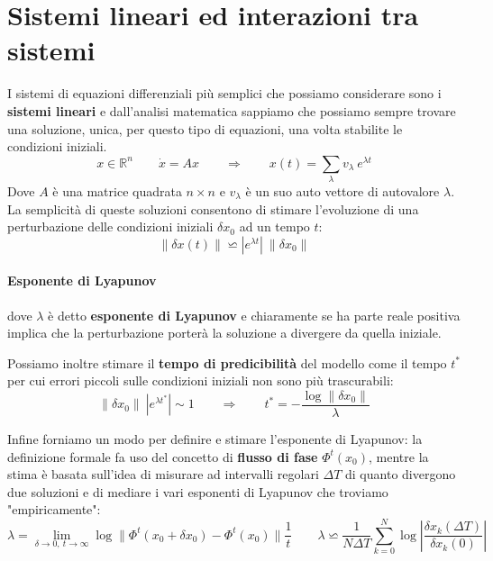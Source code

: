 \section{Sistemi lineari ed interazioni tra sistemi}

I sistemi di equazioni differenziali più semplici che possiamo considerare sono i \textbf{sistemi lineari} e dall'analisi matematica sappiamo che possiamo sempre trovare una soluzione, unica, per questo tipo di equazioni, una volta stabilite le condizioni iniziali.
\begin{equation}
	x\in\mathbb{R}^n \qquad \dot{x}=Ax \qquad \Rightarrow \qquad x(t)=\sum_\lambda v_\lambda \ e^{\lambda t}
\end{equation}
Dove $A$ è una matrice quadrata $n\times n$ e $v_\lambda$ è un suo auto vettore di autovalore $\lambda$.\\

La semplicità di queste soluzioni consentono di stimare l'evoluzione di una perturbazione delle condizioni iniziali $\delta x_0$ ad un tempo $t$:
\begin{equation}
	\|\delta x(t)\| \backsimeq |e^{\lambda t}|\ \|\delta x_0\|
\end{equation}
\paragraph{Esponente di Lyapunov}
dove $\lambda$ è detto \textbf{esponente di Lyapunov} e chiaramente se ha parte reale positiva implica che la perturbazione porterà la soluzione a divergere da quella iniziale.

Possiamo inoltre stimare il \textbf{tempo di predicibilità} del modello come il tempo $t^*$ per cui errori piccoli sulle condizioni iniziali non sono più trascurabili:
\begin{equation}
	\|\delta x_0\| \ |e^{\lambda t^*}|\sim1\qquad\Rightarrow\qquad t^*=-\frac{\log\|\delta x_0\|}{\lambda}
\end{equation}

Infine forniamo un modo per definire e stimare l'esponente di Lyapunov: la definizione formale fa uso del concetto di \textbf{flusso di fase} $\Phi^t(x_0)$, mentre la stima è basata sull'idea di misurare ad intervalli regolari $\Delta T$ di quanto divergono due soluzioni e di mediare i vari esponenti di Lyapunov che troviamo "empiricamente":
\begin{equation}
	\lambda=\lim_{\delta\rightarrow0,\ t\rightarrow\infty}\log\|\Phi^t(x_0+\delta x_0)-\Phi^t(x_0)\| \frac{1}{t} \qquad \lambda\backsimeq\frac{1}{N\Delta T}\sum_{k=0}^N \log |\frac{\delta x_k(\Delta T)}{\delta x_k(0)}|
\end{equation} 


